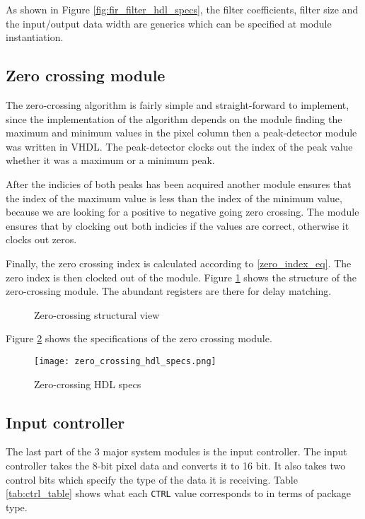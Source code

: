 As shown in Figure \ref{fig:fir_filter_hdl_specs}, the filter coefficients, filter size and the input/output data width are generics which can be specified at module instantiation.

\subsection{Zero crossing module}

The zero-crossing algorithm is fairly simple and straight-forward to implement, since the implementation of the algorithm depends on the module finding the maximum and minimum values in the pixel column then a peak-detector module was written in VHDL. The peak-detector clocks out the index of the peak value whether it was a maximum or a minimum peak.

After the indicies of both peaks has been acquired another module ensures that the index of the maximum value is less than the index of the minimum value, because we are looking for a positive to negative going zero crossing. The module ensures that by clocking out both indicies if the values are correct, otherwise it clocks out zeros.

Finally, the zero crossing index is calculated according to \eqref{zero_index_eq}. The zero index is then clocked out of the module. Figure \ref{fig:zero_crossing_final} shows the structure of the zero-crossing module. The abundant registers are there for delay matching.


\begin{figure}[h]
    \centering
    
    \caption{Zero-crossing structural view}
    \label{fig:zero_crossing_final}
\end{figure}

Figure \ref{fig:zero_crossing_hdl_specs} shows the specifications of the zero crossing module.


\begin{figure}[h]
    \centering
    \texttt{[image: zero\_crossing\_hdl\_specs.png]}
    \caption{Zero-crossing HDL specs}
    \label{fig:zero_crossing_hdl_specs}
\end{figure}

\subsection{Input controller}

The last part of the 3 major system modules is the input controller. The input controller takes the 8-bit pixel data and converts it to 16 bit. It also takes two control bits which specify the type of the data it is receiving. Table \ref{tab:ctrl_table} shows what each \texttt{CTRL} value corresponds to in terms of package type.

